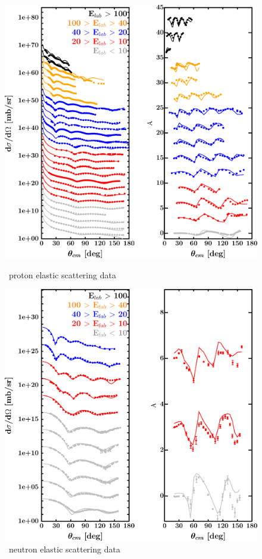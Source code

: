 \label{ni58DOMOutput}
\begin{figure}[H]
    \centering
    \begin{minipage}{0.45\textwidth}
        \centering
        \includegraphics[width=1.0\textwidth]{figures/ni58_protonElastic.png}
        \caption{\niEight\ proton elastic scattering data}
        \label{DOMFitData_ni58_proton_elastic}
    \end{minipage}\hfill
    \begin{minipage}{0.45\textwidth}
        \centering
        \includegraphics[width=1.0\textwidth]{figures/ni58_neutronElastic.png}
        \caption{\niEight\ neutron elastic scattering data}
        \label{DOMFitData_ni58_neutron_elastic}
    \end{minipage}
\end{figure}

